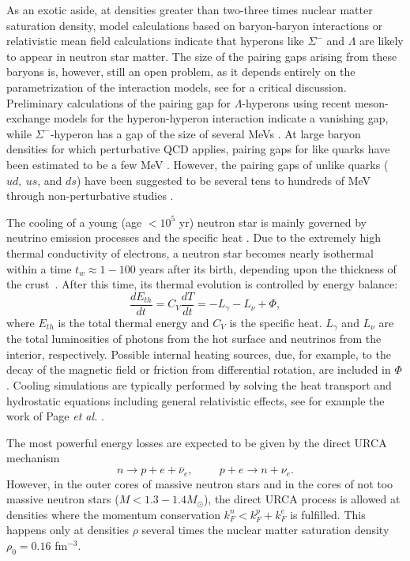 \documentclass[rmp,aps,floatfix]{revtex4}
\begin{document}
As an exotic aside, at densities greater than two-three times nuclear
matter saturation density, model calculations based on baryon-baryon
interactions \cite{stoks99,stoks2000,isaac2000,schulze1998,schulze2000b} or relativistic mean field calculations \cite{glendenning2000} indicate that hyperons like $\Sigma^-$ 
and $\Lambda$ are likely to appear in neutron star matter.
The size of the pairing gaps arising from these baryons is, however,
still an open problem, as it  depends entirely on the parametrization 
of the interaction models, see \cite{barnea1996,balberg1999,taka2002} 
for a critical 
discussion. 
Preliminary calculations of the pairing gap for $\Lambda$-hyperons
using recent  meson-exchange models for the hyperon-hyperon interaction  
\cite{stoks99} indicate a vanishing gap, while $\Sigma^-$-hyperon
has a gap of the size of several MeVs \cite{shulzeelgaroy_priv}.
 At large baryon densities for which perturbative QCD
applies, pairing gaps for like quarks have been estimated to be a few
MeV \cite{bailin84}.  However, the pairing gaps of unlike quarks ($ud,~
us$, and $ds$) have been suggested to be several tens to
hundreds of MeV through non-perturbative studies \cite{qsf0}.

The cooling of a young (age $<10^5$ yr) neutron star is mainly
governed by neutrino emission processes and the specific heat
\cite{page2000,schaab1996a,schaab1996b}.  
Due to the extremely high thermal conductivity of
electrons, a neutron star becomes nearly isothermal within a time
$t_w\approx1-100$ years after its birth, depending upon the thickness
of the crust~\cite{pr95}.  After this time, its thermal evolution is
controlled by energy balance: 
\begin{equation}
 \frac{dE_{th}}{dt} = C_V \frac{dT}{dt} = -L_{\gamma} -L_{\nu} + \Phi,
\label{equ:balance}
\end{equation} 
where $E_{th}$ is the total thermal energy and $C_V$ is the
specific heat.  $L_{\gamma}$ and $L_{\nu}$ are the total luminosities
of photons from the hot surface and neutrinos from the interior,
respectively.  Possible internal heating sources, due, for example, to
the decay of the magnetic field or friction from differential
rotation, are included in $\Phi$.  
Cooling simulations are typically performed
by solving the heat transport and hydrostatic equations including
general relativistic effects, see for example the work of Page 
{\em et al.} \cite{page2000}.  

The most powerful energy losses are expected to be given by the 
direct URCA mechanism
\begin{equation}
    n\rightarrow p +e +\overline{\nu}_e, \hspace{1cm} p+e \rightarrow
    n+\nu_e .
    \label{eq:directU}
\end{equation}
However, in the outer cores of massive neutron stars and in the
cores of not too massive neutron stars ($M < 1.3-1.4 M_{\odot}$), the direct
URCA process is allowed at densities
where the momentum conservation $k_F^n < k_F^p + k_F^e$ is
fulfilled. This happens
only at densities $\rho$ several times
the nuclear matter saturation density $\rho_0 =0.16$ fm$^{-3}$.
\end{document}
